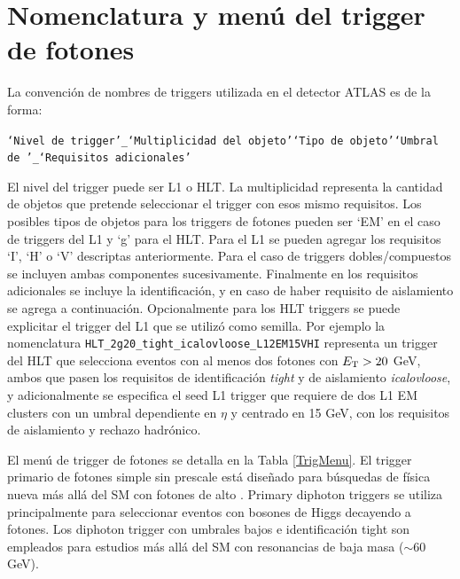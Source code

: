 \section{Nomenclatura y menú del trigger de fotones}


La convención de nombres de triggers utilizada en el detector ATLAS es de la forma:

{\footnotesize \texttt{`Nivel de trigger'\_`Multiplicidad del objeto'`Tipo de objeto'`Umbral de \ET'\_`Requisitos adicionales'}}


El nivel del trigger puede ser L1 o HLT. La multiplicidad representa la cantidad de objetos que pretende seleccionar el trigger con esos mismo requisitos. Los posibles tipos de objetos para los triggers de fotones pueden ser `EM' en el caso de triggers del L1 y `g' para el HLT. Para el L1 se pueden agregar los requisitos `I', `H' o `V'  descriptas anteriormente. Para el caso de triggers dobles/compuestos  se incluyen ambas componentes sucesivamente. Finalmente en los requisitos adicionales se incluye la identificación, y en caso de haber requisito de aislamiento se agrega a continuación. Opcionalmente para los HLT triggers se puede explicitar el trigger del L1 que se utilizó como semilla. Por ejemplo la nomenclatura \texttt{HLT\_2g20\_tight\_icalovloose\_L12EM15VHI} representa un trigger del HLT que selecciona eventos con al menos dos fotones con $E_{\text{T}}>20$ GeV, ambos que pasen los requisitos de identificación \textit{tight} y de aislamiento \textit{icalovloose}, y adicionalmente se especifica el seed L1 trigger que requiere de dos L1 EM clusters con un umbral dependiente en $\eta$ y centrado en 15 GeV, con los requisitos de aislamiento y rechazo hadrónico.

El menú de trigger de fotones se detalla en la Tabla \ref{TrigMenu}. El trigger primario de fotones simple sin prescale está diseñado para búsquedas de física nueva más allá del SM con fotones de alto \ET.  Primary diphoton triggers se utiliza principalmente para seleccionar eventos con bosones de Higgs decayendo a fotones. Los diphoton trigger con umbrales bajos e identificación tight son empleados para estudios más allá del SM con resonancias de baja masa ($\sim60$ GeV).



